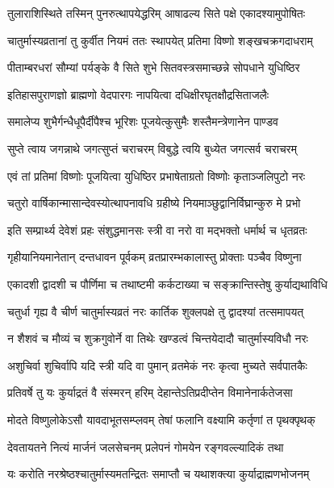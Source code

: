 \twolineshloka
{तुलाराशिस्थिते तस्मिन् पुनरुत्थापयेद्धरिम्}
{आषाढल्य सिते पक्षे एकादश्यामुपोषितः} %

\twolineshloka
{चातुर्मास्यव्रतानां तु कुर्वीत नियमं ततः}
{स्थापयेत् प्रतिमा विष्णो शङ्खचक्रगदाधराम्} %

\twolineshloka
{पीताम्बरधरां सौम्यां पर्यङ्के वै सिते शुभे}
{सितवस्त्रसमाच्छन्ने सोपधाने युधिष्ठिर} %

\twolineshloka
{इतिहासपुराणज्ञो ब्राह्मणो वेदपारगः}
{नापयित्वा दधिक्षीरघृतक्षौद्रसिताजलैः} %

\twolineshloka
{समालेप्य शुभैर्गन्धैधूपैर्दीपैश्च भूरिशः}
{पूजयेत्कुसुमैः शस्तैमन्त्रेणानेन पाण्डव} %

\twolineshloka
{सुप्ते त्वाय जगन्नाथे जगत्सुप्तं चराचरम्}
{विबुद्धे त्वयि बुध्येत जगत्सर्व चराचरम्} %

\twolineshloka
{एवं तां प्रतिमां विष्णोः पूजयित्वा युधिष्ठिर}
{प्रभाषेताग्रतो विष्णोः कृताञ्जलिपुटो नरः} %

\twolineshloka
{चतुरो वार्षिकान्मासान्देवस्योत्थापनावधि}
{ग्रहीष्ये नियमाञ्छुद्वानिर्विघ्रान्कुरु मे प्रभो} %

\twolineshloka
{इति सम्प्रार्थ्य देवेशं प्रहः संशुद्धमानसः}
{स्त्री वा नरो वा मद्भक्तो धर्मार्थ च धृतव्रतः} %

\twolineshloka
{गृहीयानियमानेतान् दन्तधावन पूर्वकम्}
{व्रतप्रारम्भकालास्तु प्रोक्ताः पञ्चैव विष्णुना} %

\twolineshloka
{एकादशी द्वादशी च पौर्णिमा च तथाष्टमी}
{कर्कटाख्या च सङ्क्रान्तिस्तेषु कुर्याद्यथाविधि} %

\twolineshloka
{चतुर्धा गृह्य वै चीर्ण चातुर्मास्यव्रतं नरः}
{कार्तिक शुक्लपक्षे तु द्वादश्यां तत्समापयत्} %

\twolineshloka
{न शैशवं च मौव्यं च शुक्रगुवोर्ने वा तिथेः}
{खण्डत्वं चिन्तयेदादौ चातुर्मास्यविधौ नरः} %

\twolineshloka
{अशुचिर्वा शुचिर्वापि यदि स्त्री यदि वा पुमान्}
{व्रतमेकं नरः कृत्वा मुच्यते सर्वपातकैः} %

\twolineshloka
{प्रतिवर्षे तु यः कुर्याद्रतं वै संस्मरन् हरिम्}
{देहान्तेऽतिप्रदीप्तेन विमानेनार्कतेजसा} %

\twolineshloka
{मोदते विष्णुलोकेऽसौ यावदाभूतसम्प्लवम्}
{तेषां फलानि वक्ष्यामि कर्तृणां त पृथक्पृथक्} %

\twolineshloka
{देवतायतने नित्यं मार्जनं जलसेचनम्}
{प्रलेपनं गोमयेन रङ्गवल्ल्यादिकं तथा} %

\twolineshloka
{यः करोति नरश्रेष्ठश्चातुर्मास्यमतन्द्रितः}
{समाप्तौ च यथाशक्त्या कुर्याद्राह्मणभोजनम्} %

